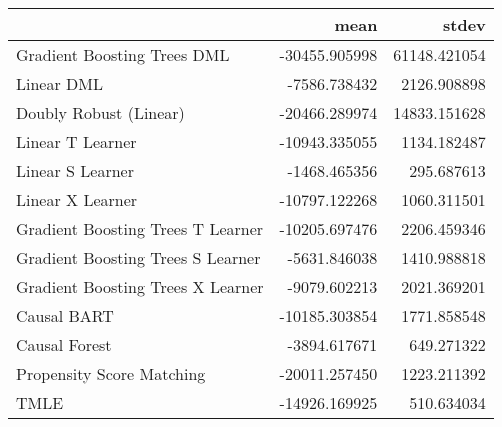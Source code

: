 \begin{tabular}{lrr}
\toprule
{} &          mean &         stdev \\
\midrule
Gradient Boosting Trees DML       & -30455.905998 &  61148.421054 \\
Linear DML                        &  -7586.738432 &   2126.908898 \\
Doubly Robust (Linear)            & -20466.289974 &  14833.151628 \\
Linear T Learner                  & -10943.335055 &   1134.182487 \\
Linear S Learner                  &  -1468.465356 &    295.687613 \\
Linear X Learner                  & -10797.122268 &   1060.311501 \\
Gradient Boosting Trees T Learner & -10205.697476 &   2206.459346 \\
Gradient Boosting Trees S Learner &  -5631.846038 &   1410.988818 \\
Gradient Boosting Trees X Learner &  -9079.602213 &   2021.369201 \\
Causal BART                       & -10185.303854 &   1771.858548 \\
Causal Forest                     &  -3894.617671 &    649.271322 \\
Propensity Score Matching         & -20011.257450 &   1223.211392 \\
TMLE                              & -14926.169925 &    510.634034 \\
\bottomrule
\end{tabular}
